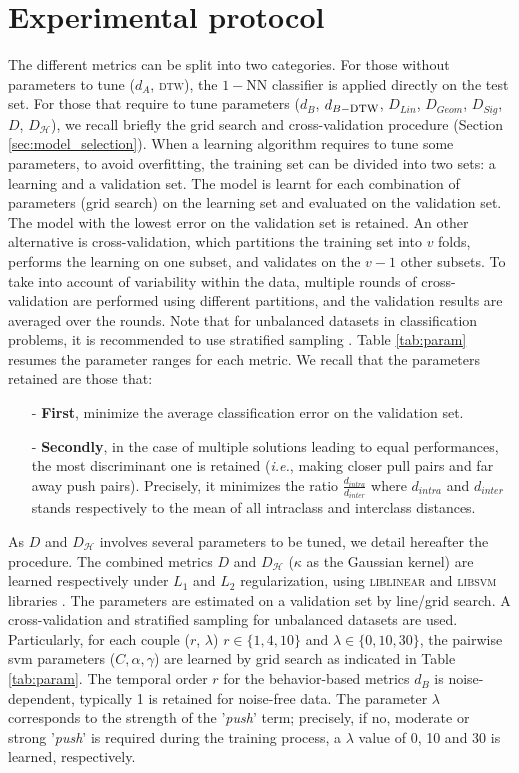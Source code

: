 \section{Experimental protocol}
The different metrics can be split into two categories. For those without parameters to tune ($d_A$, \textsc{dtw}), the $1-$NN classifier is applied directly on the test set. For those that require to tune parameters ($d_B$, $d_{B-\mbox{\sc dtw}}$, $D_{Lin}$, $D_{Geom}$, $D_{Sig}$, $D$, $D_{\mathcal{H}}$), we recall briefly the grid search and cross-validation procedure (Section \ref{sec:model_selection}). When a learning algorithm requires to tune some parameters, to avoid overfitting, the training set can be divided into two sets: a learning and a validation set. The model is learnt for each combination of parameters (grid search) on the learning set and evaluated on the validation set. The model with the lowest error on the validation set is retained. An other alternative is cross-validation, which partitions the training set into $v$ folds, performs the learning on one subset, and validates on the $v-1$ other subsets. To take into account of variability within the data, multiple rounds of cross-validation are performed using different partitions, and the validation results are averaged over the rounds. Note that for unbalanced datasets in classification problems, it is recommended to use stratified sampling . Table \ref{tab:param} resumes the parameter ranges for each metric. We recall that the parameters retained are those that:
\begin{itemize}
	\item[-] \textbf{First}, minimize the average classification error on the validation set.
	\item[-] \textbf{Secondly}, in the case of multiple solutions leading to equal performances, the most discriminant one is retained (\textit{i.e.}, making closer pull pairs and far away push pairs). Precisely, it minimizes the ratio $\frac{d_{intra}}{d_{inter}}$ where $d_{intra}$ and $d_{inter}$ stands respectively to the mean of all intraclass and interclass distances.
\end{itemize} 
\noindent As $D$ and $D_{\mathcal{H}}$ involves several parameters to be tuned, we detail hereafter the procedure. The combined metrics $D$ and $D_{\mathcal{H}}$  ($\kappa$ as the Gaussian kernel) are learned respectively under $L_1$ and $L_2$ regularization, using \textsc{liblinear}  and \textsc{libsvm} libraries \cite{Fan2008,Hsu2008}. The parameters are estimated on a validation set by line/grid search. A cross-validation and stratified sampling for unbalanced datasets are used.  Particularly, for each  couple ($r$, $\lambda$) $r \in \{1, 4, 10\}$ and $\lambda \in \{0, 10, 30\}$, the pairwise {\sc svm} parameters ($C,\alpha, \gamma$) are learned by grid search as indicated in Table \ref{tab:param}. The temporal order $r$ for the behavior-based metrics $d_B$ is noise-dependent, typically 1 is retained for noise-free data. The parameter $\lambda$ corresponds to the strength of the '{\it push}' term; precisely, if no, moderate or  strong '{\it push}'  is required during the training process, a $\lambda$ value of  0, 10 and 30 is learned, respectively. 

